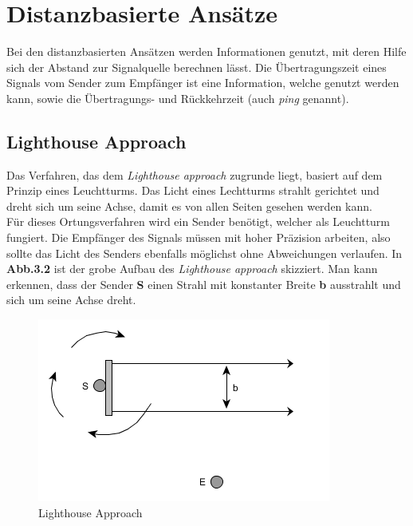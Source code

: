 \documentclass[12pt, a4wide]{scrreprt}
\begin{document}
  \section{Distanzbasierte Ansätze}
Bei den distanzbasierten Ansätzen werden Informationen genutzt, mit deren Hilfe sich der Abstand zur Signalquelle berechnen lässt. Die Übertragungszeit eines Signals vom Sender zum Empfänger ist eine Information, welche genutzt werden kann, sowie die Übertragungs- und Rückkehrzeit (auch \textit{ping} genannt).
    \subsection{Lighthouse Approach}
Das Verfahren, das dem \textit{Lighthouse approach} zugrunde liegt, basiert auf dem Prinzip eines Leuchtturms. Das Licht eines Lechtturms strahlt gerichtet und dreht sich um seine Achse, damit es von allen Seiten gesehen werden kann.\\
\indent
Für dieses Ortungsverfahren wird ein Sender benötigt, welcher als Leuchtturm fungiert. Die Empfänger des Signals müssen mit hoher Präzision arbeiten, also sollte das Licht des Senders ebenfalls möglichst ohne Abweichungen verlaufen. In {\bf Abb.3.2} ist der grobe Aufbau des \textit{Lighthouse approach} skizziert. Man kann erkennen, dass der Sender {\bf S} einen Strahl mit konstanter Breite {\bf b} ausstrahlt und sich um seine Achse dreht.\\

\begin{figure}[!htb]
\centering
\includegraphics[scale=.78]{lighthouse.png}
\caption{Lighthouse Approach}
\end{figure}
\end{document}
